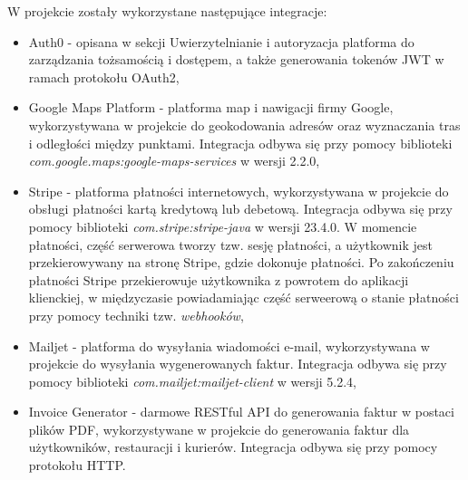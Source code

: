 W projekcie zostały wykorzystane następujące integracje:

\begin{itemize}

    \item Auth0 \cite{auth0} - opisana w sekcji Uwierzytelnianie i autoryzacja platforma do zarządzania tożsamością i dostępem, a także generowania tokenów JWT w ramach protokołu OAuth2,
    \item Google Maps Platform \cite{gmaps} - platforma map i nawigacji firmy Google, wykorzystywana w projekcie do geokodowania adresów oraz wyznaczania tras i odległości między punktami. Integracja odbywa się przy pomocy biblioteki \newline \textit{com.google.maps:google-maps-services} w wersji 2.2.0,
    \item Stripe \cite{stripe} - platforma płatności internetowych, wykorzystywana w projekcie do obsługi płatności kartą kredytową lub debetową. Integracja odbywa się przy pomocy biblioteki \textit{com.stripe:stripe-java} w wersji 23.4.0. W momencie płatności, część serwerowa tworzy tzw. sesję płatności, a użytkownik jest przekierowywany na stronę Stripe, gdzie dokonuje płatności. Po zakończeniu płatności Stripe przekierowuje użytkownika z powrotem do aplikacji klienckiej, w międzyczasie powiadamiając część serweerową o stanie płatności przy pomocy techniki tzw. \textit{webhooków},
    \item Mailjet \cite{mailjet} - platforma do wysyłania wiadomości e-mail, wykorzystywana w projekcie do wysyłania wygenerowanych faktur. Integracja odbywa się przy pomocy biblioteki \textit{com.mailjet:mailjet-client} w wersji 5.2.4,
    \item Invoice Generator \cite{invoicegenerator} - darmowe RESTful API do generowania faktur w postaci plików PDF, wykorzystywane w projekcie do generowania faktur dla użytkowników, restauracji i kurierów. Integracja odbywa się przy pomocy protokołu HTTP.

\end{itemize}